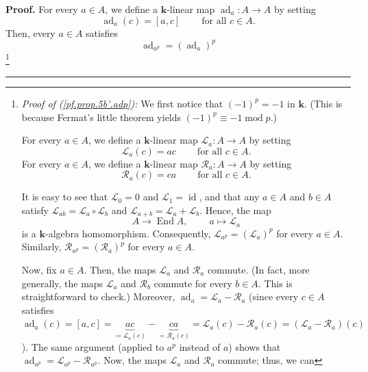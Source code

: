 \documentclass[numbers=enddot,12pt,final,onecolumn,notitlepage]{scrartcl}%
\theoremstyle{definition}
\newenvironment{proof}[1][Proof]{\noindent\textbf{#1.} }{\ \rule{0.5em}{0.5em}}
\begin{document}
\begin{proof}
For every $a\in A$, we define a $\mathbf{k}$-linear map $\operatorname*{ad}%
\nolimits_{a}:A\rightarrow A$ by setting%
\[
\operatorname*{ad}\nolimits_{a}\left(  c\right)  =\left[  a,c\right]
\ \ \ \ \ \ \ \ \ \ \text{for all }c\in A.
\]
Then, every $a\in A$ satisfies%
\begin{equation}
\operatorname*{ad}\nolimits_{a^{p}}=\left(  \operatorname*{ad}\nolimits_{a}%
\right)  ^{p} \label{pf.prop.5b'.adp}%
\end{equation}
\footnote{\textit{Proof of (\ref{pf.prop.5b'.adp}):} We first notice that
$\left(  -1\right)  ^{p}=-1$ in $\mathbf{k}$. (This is because Fermat's little
theorem yields $\left(  -1\right)  ^{p}\equiv-1\operatorname{mod}p$.)
\par
For every $a\in A$, we define a $\mathbf{k}$-linear map $\mathcal{L}%
_{a}:A\rightarrow A$ by setting%
\[
\mathcal{L}_{a}\left(  c\right)  =ac\ \ \ \ \ \ \ \ \ \ \text{for all }c\in
A.
\]
For every $a\in A$, we define a $\mathbf{k}$-linear map $\mathcal{R}%
_{a}:A\rightarrow A$ by setting%
\[
\mathcal{R}_{a}\left(  c\right)  =ca\ \ \ \ \ \ \ \ \ \ \text{for all }c\in
A.
\]
\par
It is easy to see that $\mathcal{L}_{0}=0$ and $\mathcal{L}_{1}%
=\operatorname*{id}$, and that any $a\in A$ and $b\in A$ satisfy
$\mathcal{L}_{ab}=\mathcal{L}_{a}\circ\mathcal{L}_{b}$ and $\mathcal{L}%
_{a+b}=\mathcal{L}_{a}+\mathcal{L}_{b}$. Hence, the map%
\[
A\rightarrow\operatorname*{End}A,\ \ \ \ \ \ \ \ \ \ a\mapsto\mathcal{L}_{a}%
\]
is a $\mathbf{k}$-algebra homomorphism. Consequently, $\mathcal{L}_{a^{p}%
}=\left(  \mathcal{L}_{a}\right)  ^{p}$ for every $a\in A$. Similarly,
$\mathcal{R}_{a^{p}}=\left(  \mathcal{R}_{a}\right)  ^{p}$ for every $a\in A$.
\par
Now, fix $a\in A$. Then, the maps $\mathcal{L}_{a}$ and $\mathcal{R}_{a}$
commute. (In fact, more generally, the maps $\mathcal{L}_{a}$ and
$\mathcal{R}_{b}$ commute for every $b\in A$. This is straightforward to
check.) Moreover, $\operatorname*{ad}\nolimits_{a}=\mathcal{L}_{a}%
-\mathcal{R}_{a}$ (since every $c\in A$ satisfies $\operatorname*{ad}%
\nolimits_{a}\left(  c\right)  =\left[  a,c\right]  =\underbrace{ac}%
_{=\mathcal{L}_{a}\left(  c\right)  }-\underbrace{ca}_{=\mathcal{R}_{a}\left(
c\right)  }=\mathcal{L}_{a}\left(  c\right)  -\mathcal{R}_{a}\left(  c\right)
=\left(  \mathcal{L}_{a}-\mathcal{R}_{a}\right)  \left(  c\right)  $). The
same argument (applied to $a^{p}$ instead of $a$) shows that
$\operatorname*{ad}\nolimits_{a^{p}}=\mathcal{L}_{a^{p}}-\mathcal{R}_{a^{p}}$.
Now, the maps $\mathcal{L}_{a}$ and $\mathcal{R}_{a}$ commute; thus, we can
}
\end{proof}
\end{document}
